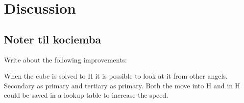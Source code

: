 \chapter{Discussion}

\section{Noter til kociemba}

Write about the following improvements:

When the cube is solved to H it is possible to look at it from other angels. Secondary as primary and tertiary as primary.
Both the move into H and in H could be saved in a lookup table to increase the speed.
